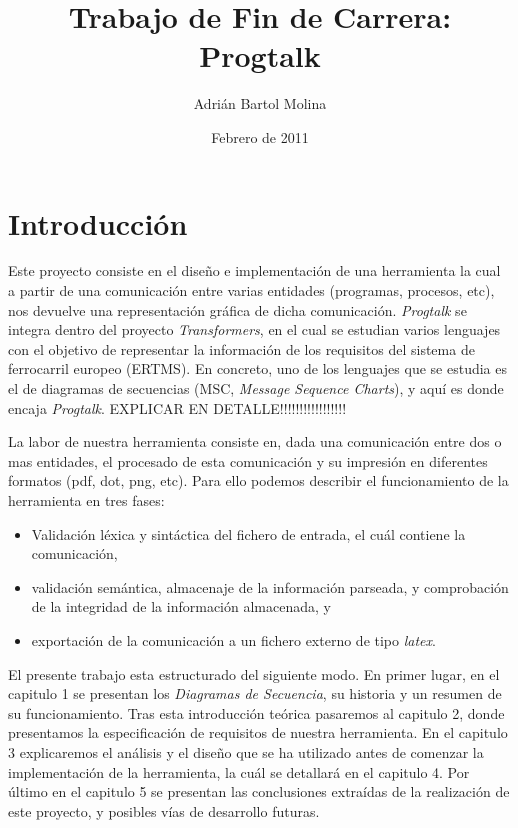 \documentclass[12pt,a4paper]{report}
\title{Trabajo de Fin de Carrera: Progtalk}
\author{Adrián Bartol Molina}
\date{Febrero de 2011}
\begin{document}
\maketitle
\tableofcontents

\chapter{Introducción}

Este proyecto consiste en el diseño e implementación de una herramienta la cual a partir de una comunicación entre varias entidades (programas, procesos, etc), nos devuelve una representación gráfica de dicha comunicación. \textit{Progtalk} se integra dentro del proyecto \textit{Transformers}, en el cual se estudian varios lenguajes con el objetivo de representar la información de los requisitos del sistema de ferrocarril europeo (ERTMS). En concreto, uno de los lenguajes que se estudia es el de diagramas de secuencias (MSC, \emph{Message Sequence Charts}), y aquí es donde encaja \textit{Progtalk}. EXPLICAR EN DETALLE!!!!!!!!!!!!!!!!!

La labor de nuestra herramienta consiste en, dada una comunicación entre dos o mas entidades, el procesado de esta comunicación y su impresión en diferentes formatos (pdf, dot, png, etc). Para ello podemos describir el funcionamiento de la herramienta en tres fases:

\begin{itemize}
\item Validación léxica y sintáctica del fichero de entrada, el cuál contiene la comunicación,
\item validación semántica, almacenaje de la información parseada, y comprobación de la integridad de la información almacenada, y
\item exportación de la comunicación a un fichero externo de tipo \textit{latex}.
\end{itemize}

El presente trabajo esta estructurado del siguiente modo. En primer lugar, en el capitulo 1 se presentan los \textit{Diagramas de Secuencia}, su historia y un resumen de su funcionamiento. Tras esta introducción teórica pasaremos al capitulo 2, donde presentamos la especificación de requisitos de nuestra herramienta. En el capitulo 3 explicaremos el análisis y el diseño que se ha utilizado antes de comenzar la implementación de la herramienta, la cuál se detallará en el capitulo 4. Por último en el capitulo 5 se presentan las conclusiones extraídas de la realización de este proyecto, y posibles vías de desarrollo futuras.
\end{document}
